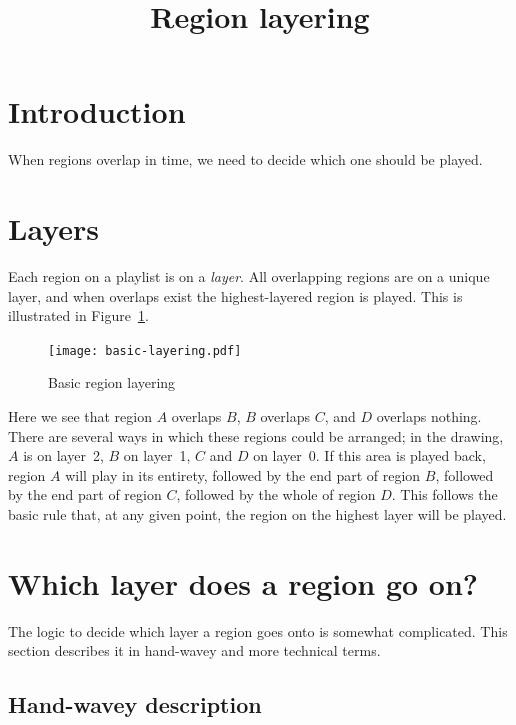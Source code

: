\documentclass{article}
\title{Region layering}
\author{}
\date{}
\begin{document}
\maketitle

\section{Introduction}

When regions overlap in time, we need to decide which one should be
played.


\section{Layers}

Each region on a playlist is on a \emph{layer}.  All overlapping regions
are on a unique layer, and when overlaps exist the highest-layered
region is played.  This is illustrated in Figure~\ref{fig:basic-layering}.

\begin{figure}[ht]
\begin{center}
\texttt{[image: basic-layering.pdf]}
\end{center}
\caption{Basic region layering}
\label{fig:basic-layering}
\end{figure}

Here we see that region $A$ overlaps $B$, $B$ overlaps $C$, and
$D$ overlaps nothing.  There are several ways in which these regions
could be arranged; in the drawing, $A$ is on layer~2, $B$ on layer~1,
$C$ and $D$ on layer~0.  If this area is played back, region $A$ will
play in its entirety, followed by the end part of region $B$, followed
by the end part of region $C$, followed by the whole of region $D$.
This follows the basic rule that, at any given point, the region on
the highest layer will be played.


\section{Which layer does a region go on?}

The logic to decide which layer a region goes onto is somewhat complicated.
This section describes it in hand-wavey and more technical terms.


\subsection{Hand-wavey description}
\end{document}
